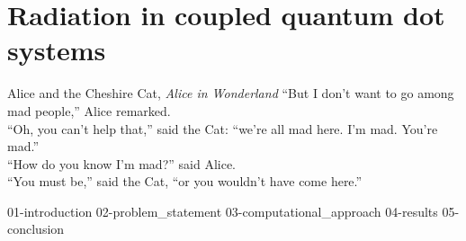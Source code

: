 \chapter{\label{ch:quantum dots}Radiation in coupled quantum dot systems}

\begin{frontquote}{Alice and the Cheshire Cat, \emph{Alice in Wonderland}}
``But I don’t want to go among mad people,'' Alice remarked. \\
``Oh, you can't help that,'' said the Cat: ``we're all mad here. I'm mad. You're mad.'' \\
``How do you know I'm mad?'' said Alice. \\
``You must be,'' said the Cat, ``or you wouldn't have come here.''\\
\end{frontquote}

{01-introduction}
{02-problem_statement}
{03-computational_approach}
{04-results}
{05-conclusion}
